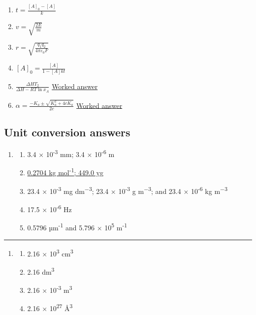 \documentclass[
]{book}
\providecommand{\tightlist}{%
  \setlength{\itemsep}{0pt}\setlength{\parskip}{0pt}}
\begin{document}
\begin{enumerate}
\def\labelenumi{\arabic{enumi}.}
\item
  \(t =\frac{[A]_0-[A]}{k}\)
\item
  \(v = \sqrt {\frac{2E}{m}}\)
\item
  \(r = \sqrt{\frac{q_1 q_2}{4 \pi \varepsilon_0 F }}\)
\item
  \([A]_0=\frac{[A]}{1-[A]kt}\)
\item
  \(\frac{\Delta H T_2}{\Delta H - R T \ln {x_A}}\) \href{https://www.youtube.com/embed/WmryM91dcXE}{Worked answer}
\item
  \(\alpha = \frac{-K_a \pm \sqrt{K_a^2 + 4 c K_a}}{2c}\) \href{https://www.youtube.com/embed/F7em5K2b4to}{Worked answer}
\end{enumerate}

\hypertarget{subsec:Unitconvans}{%
\subsection{Unit conversion answers}\label{subsec:Unitconvans}}

\begin{enumerate}
\def\labelenumi{\arabic{enumi}.}
\item
  \begin{enumerate}
  \def\labelenumii{\alph{enumii}.}
  \tightlist
  \item
    3.4 × 10\textsuperscript{-3} mm; 3.4 × 10\textsuperscript{-6} m
  \item
    \href{https://www.youtube.com/embed/IKM6a3VxWKs}{0.2704 kg mol\textsuperscript{-1}; 449.0 yg}
  \item
    23.4 × 10\textsuperscript{-3} mg dm\textsuperscript{−3}; 23.4 × 10\textsuperscript{-3} g m\textsuperscript{−3}; and 23.4 × 10\textsuperscript{-6} kg m\textsuperscript{−3}
  \item
    17.5 × 10\textsuperscript{-6} Hz
  \item
    0.5796 µm\textsuperscript{-1} and 5.796 × 10\textsuperscript{5} m\textsuperscript{-1}
  \end{enumerate}
\end{enumerate}

\begin{center}\rule{0.5\linewidth}{0.5pt}\end{center}

\begin{enumerate}
\def\labelenumi{\arabic{enumi}.}
\setcounter{enumi}{1}
\item
  \begin{enumerate}
  \def\labelenumii{\alph{enumii}.}
  \tightlist
  \item
    2.16 × 10\textsuperscript{3} cm\textsuperscript{3}
  \item
    2.16 dm\textsuperscript{3}
  \item
    2.16 × 10\textsuperscript{-3} m\textsuperscript{3}
  \item
    2.16 × 10\textsuperscript{27} Å\textsuperscript{3}
  \end{enumerate}
\end{enumerate}
\end{document}

